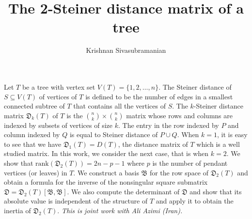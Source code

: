 \documentclass[a4paper]{amsart}
\date{}
\newcommand{\DD}{\mathfrak{D}}
\newcommand{\BB}{\mathfrak{B}}
\newcommand{\rk}{\mathrm{rank}}
\begin{document}
\title{The 2-Steiner distance matrix of a tree}
\author{Krishnan Sivasubramanian} %
\address{Department of Mathematics, IIT Bombay, Mumabi 400076, India} %

\maketitle


Let $T$ be a tree with vertex set $V(T)=\{1,2,\ldots,n\}$. 
The Steiner distance of $S\subseteq V(T)$ of vertices
of $T$ is defined to be the number of edges in a smallest 
connected subtree of $T$ that contains all the vertices of $S$. 
The $k$-Steiner distance matrix $\DD_k(T)$ of $T$ is the 
$\binom{n}{k}\times \binom{n}{k}$ matrix whose rows 
and columns are indexed by subsets of vertices of size $k$.
The entry in the row indexed by $P$ and column indexed 
by $Q$ is equal to Steiner distance of $P \cup Q$. 
When $k=1$, it is easy to see that we have
$\DD_1(T) = D(T)$, the distance matrix of $T$ which is a 
well studied matrix.  In this work, we consider the next 
case, that is when $k=2$.  We show that $\rk(\DD_2(T)) = 2n -p - 1$ 
where $p$ is the number of pendant vertices (or leaves) in $T$.
We construct a basis $\BB$ for the row space of $\DD_2(T)$ and obtain 
a formula for the inverse of the nonsingular square submatrix 
$\DD=\DD_2(T)[\BB,\BB]$.  We also compute the determinant of 
$\DD$ and show that its absolute value is independent of the 
structure of $T$ and 
apply it to obtain the inertia of $\DD_2(T)$.  
\emph{This is joint work with Ali Azimi (Iran).}



%

\end{document}
